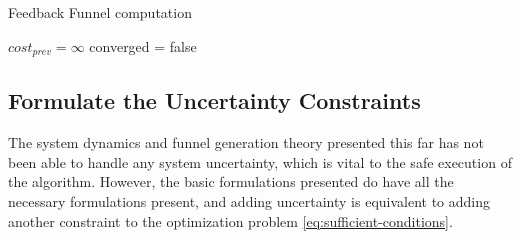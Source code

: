 \begin{algorithm}
  \caption{Feedback Funnel computation}
  \label{alg:funnelalgorithm-extended}
  \DontPrintSemicolon \SetAlgoNoLine

   

  \(cost_{prev} = \infty\)\; converged = false \; \;
\end{algorithm}


\subsection{Formulate the Uncertainty Constraints}
\label{sec:adding-uncertainty}

The system dynamics and funnel generation theory presented this far has not been
able to handle any system uncertainty, which is vital to the safe execution of
the \rrtfunnel{} algorithm. However, the basic formulations presented do have
all the necessary formulations present, and adding uncertainty is equivalent to
adding another constraint to the optimization problem
\cref{eq:sufficient-conditions}.

